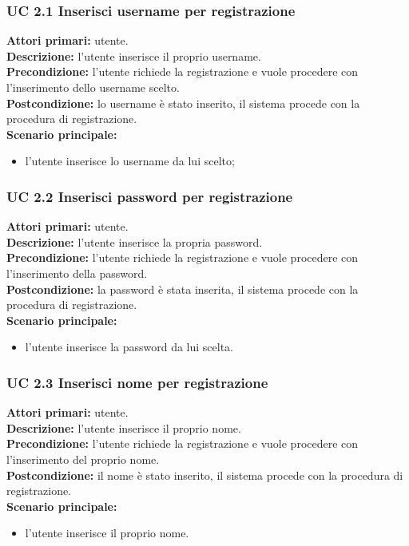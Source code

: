 \subsubsection{UC 2.1 Inserisci username per registrazione}
\noindent
\textbf{Attori primari:} utente.\\
\textbf{Descrizione:} l'utente inserisce il proprio username.\\
\textbf{Precondizione:} l'utente richiede la registrazione e vuole procedere con l'inserimento dello username scelto.\\
\textbf{Postcondizione:} lo username è stato inserito, il sistema procede con la procedura di registrazione.\\
\textbf{Scenario principale:}
\begin{itemize}
\item l'utente inserisce lo username da lui scelto;
\end{itemize}

\subsubsection{UC 2.2 Inserisci password per registrazione}
\noindent
\textbf{Attori primari:} utente.\\
\textbf{Descrizione:} l'utente inserisce la propria password.\\
\textbf{Precondizione:} l'utente richiede la registrazione e vuole procedere con l'inserimento della password.\\
\textbf{Postcondizione:} la password è stata inserita, il sistema procede con la procedura di registrazione.\\
\textbf{Scenario principale:}
\begin{itemize}
\item l'utente inserisce la password da lui scelta.
\end{itemize}

\subsubsection{UC 2.3 Inserisci nome per registrazione}
\noindent
\textbf{Attori primari:} utente.\\
\textbf{Descrizione:} l'utente inserisce il proprio nome.\\
\textbf{Precondizione:} l'utente richiede la registrazione e vuole procedere con l'inserimento del proprio nome.\\
\textbf{Postcondizione:} il nome è stato inserito, il sistema procede con la procedura di registrazione.\\
\textbf{Scenario principale:}
\begin{itemize}
\item l'utente inserisce il proprio nome.
\end{itemize}

